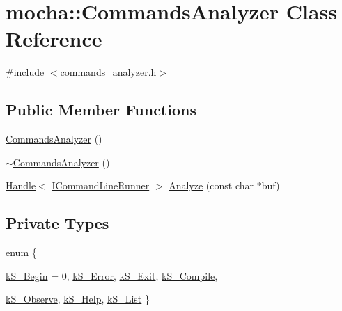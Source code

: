 \hypertarget{classmocha_1_1_commands_analyzer}{
\section{mocha::CommandsAnalyzer Class Reference}
\label{classmocha_1_1_commands_analyzer}
}


{\ttfamily \#include $<$commands\_\-analyzer.h$>$}

\subsection*{Public Member Functions}
\begin{DoxyCompactItemize}
\item 
\hyperlink{classmocha_1_1_commands_analyzer_a15bbeeb2aaf598f68b378c788df8f455}{CommandsAnalyzer} ()
\item 
\hyperlink{classmocha_1_1_commands_analyzer_a2a6d049908e18508791e6e73b093b695}{$\sim$CommandsAnalyzer} ()
\item 
\hyperlink{classmocha_1_1_handle}{Handle}$<$ \hyperlink{classmocha_1_1_i_command_line_runner}{ICommandLineRunner} $>$ \hyperlink{classmocha_1_1_commands_analyzer_a167c93eb36ede32da856009ab89bf12d}{Analyze} (const char $\ast$buf)
\end{DoxyCompactItemize}
\subsection*{Private Types}
\begin{DoxyCompactItemize}
\item 
enum \{ \par
\hyperlink{classmocha_1_1_commands_analyzer_a4dd6605d16c5d347693ea41593202fbaaac72eb816082825a9cddfaa566e254fe}{kS\_\-Begin} =  0, 
\hyperlink{classmocha_1_1_commands_analyzer_a4dd6605d16c5d347693ea41593202fbaaf2c3be0cc79df41ce0ce5572c78b6acb}{kS\_\-Error}, 
\hyperlink{classmocha_1_1_commands_analyzer_a4dd6605d16c5d347693ea41593202fbaa762179c729bdea58eb61bc03c3d619af}{kS\_\-Exit}, 
\hyperlink{classmocha_1_1_commands_analyzer_a4dd6605d16c5d347693ea41593202fbaa6895be1870543982d2d44a6ef01a1a55}{kS\_\-Compile}, 
\par
\hyperlink{classmocha_1_1_commands_analyzer_a4dd6605d16c5d347693ea41593202fbaa6f6f578d283b55b3630f5040c39536d2}{kS\_\-Observe}, 
\hyperlink{classmocha_1_1_commands_analyzer_a4dd6605d16c5d347693ea41593202fbaaffc9bc3ecfd8e01aaa29cd6f52b99614}{kS\_\-Help}, 
\hyperlink{classmocha_1_1_commands_analyzer_a4dd6605d16c5d347693ea41593202fbaa5b66e17c137fc2138fb21af4f99c024d}{kS\_\-List}
 \}
\end{DoxyCompactItemize}

